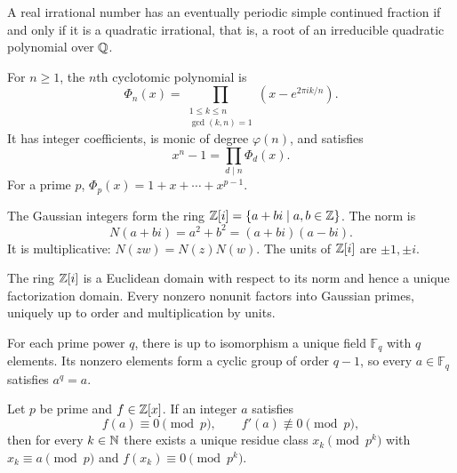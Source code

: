 \begin{theorem}
A real irrational number has an eventually periodic simple continued fraction if and only if it is a quadratic irrational, that is, a root of an irreducible quadratic polynomial over $\mathbb{Q}$.
\end{theorem}

\begin{definition}
For $n\ge1$, the $n$th cyclotomic polynomial is
\[
 \Phi_n(x)=\prod_{\substack{1\le k\le n\\\gcd(k,n)=1}}
 \left(x-e^{2\pi i k/n}\right).
\]
It has integer coefficients, is monic of degree $\varphi(n)$, and satisfies
\[
 x^n-1=\prod_{d\mid n}\Phi_d(x).
\]
For a prime $p$, $\Phi_p(x)=1+x+\cdots+x^{p-1}$.
\end{definition}

\begin{definition}
The Gaussian integers form the ring $\mathbb{Z}[i]=\{a+bi\mid a, b\in\mathbb{Z}\}$. The norm is
\[
 N(a+bi)=a^2+b^2=(a+bi)(a-bi).
\]
It is multiplicative: $N(zw)=N(z)N(w)$. The units of $\mathbb{Z}[i]$ are $\pm1, \pm i$.
\end{definition}

\begin{theorem}
The ring $\mathbb{Z}[i]$ is a Euclidean domain with respect to its norm and hence a unique factorization domain. Every nonzero nonunit factors into Gaussian primes, uniquely up to order and multiplication by units.
\end{theorem}

\begin{theorem}
For each prime power $q$, there is up to isomorphism a unique field $\mathbb{F}_q$ with $q$ elements. Its nonzero elements form a cyclic group of order $q-1$, so every $a\in\mathbb{F}_q$ satisfies $a^q=a$.
\end{theorem}

\begin{theorem}
Let $p$ be prime and $f\in\mathbb{Z}[x]$. If an integer $a$ satisfies
\[
 f(a)\equiv0\pmod p,
 \qquad f'(a)\not\equiv0\pmod p,
\]
then for every $k\in\mathbb{N}$ there exists a unique residue class $x_k\pmod{p^k}$ with $x_k\equiv a\pmod p$ and $f(x_k)\equiv0\pmod{p^k}$.
\end{theorem}
